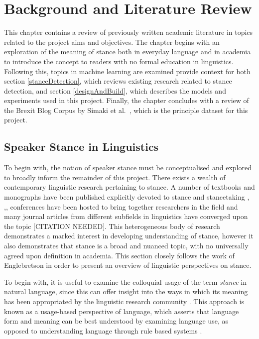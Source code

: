 \documentclass[Dissertation.tex]{subfiles}
\begin{document}
\chapter{Background and Literature Review}
This chapter contains a review of previously written academic literature in topics related to the project aims and objectives. The chapter begins with an exploration of the meaning of stance both in everyday language and in academia to introduce the concept to readers with no formal education in linguistics.  Following this, topics in machine learning are examined provide context for both section \ref{stanceDetection}, which reviews existing research related to stance detection, and section \ref{designAndBuild}, which describes the models and experiments used in this project. Finally, the chapter concludes with a review of the Brexit Blog Corpus by Simaki et al.\ \cite{simakiAnnotatingSpeakerStance2017}, which is the principle dataset for this project.
 
\section{Speaker Stance in Linguistics}
To begin with, the notion of speaker stance must be conceptualised and explored to broadly inform the remainder of this project. There exists a wealth of contemporary linguistic research pertaining to stance. A number of textbooks and monographs have been published explicitly devoted to stance and stancetaking
\cite{hunstonEvaluationTextAuthorial2000}, \cite{englebretsonStancetakingDiscourseSubjectivity2007},\cite{karkkainenEpistemicStanceEnglish2003}, 
%
conferences have been hosted to bring together researchers in the field
%
%
and  many journal articles from different subfields in linguistics have converged upon the topic [CITATION NEEDED]. This heterogeneous body of research demonstrates a marked interest in developing understanding of stance, however it also demonstrates that stance is a broad and nuanced topic, with no universally agreed upon definition in academia. This section closely follows the work of Englebretson \cite{englebretsonStancetakingDiscourseSubjectivity2007} in order to present an overview of linguistic perspectives on stance.

To begin with, it is useful to examine the colloquial usage of the term \textit{stance} in natural language, since this can offer insight into the ways in which its meaning has been appropriated by the linguistic research community \cite{englebretsonStancetakingDiscourseSubjectivity2007}. This approach is known as a usage-based perspective of language, which asserts that language form and meaning can be best understood by examining language use, as opposed to understanding language through rule based systems \cite{barlowUsagebasedModelsLanguage2000}. 
\end{document}
